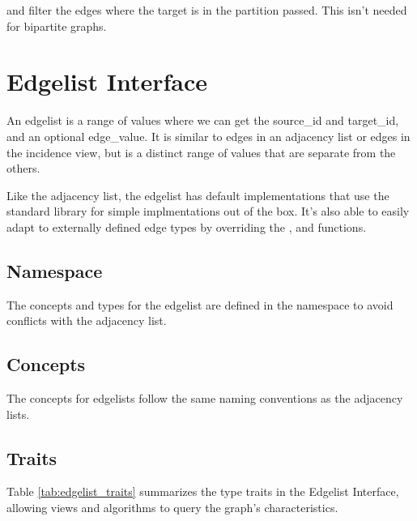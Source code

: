  and  filter the edges where the target is in the partition  passed.
This isn't needed for bipartite graphs.

\section{Edgelist Interface}
An edgelist is a range of values where we can get the source\_id and target\_id, and an optional edge\_value. It is similar to edges in an
adjacency list or edges in the incidence view, but is a distinct range of values that are separate from the others.

Like the adjacency list, the edgelist has default implementations that use the standard library for simple implmentations out of the box.
It's also able to easily adapt to externally defined edge types by overriding the ,  and 
 functions.

\subsection{Namespace}
The concepts and types for the edgelist are defined in the  namespace to avoid conflicts with the adjacency list.



\subsection{Concepts}
The concepts for edgelists follow the same naming conventions as the adjacency lists. 

{\small
     
}
\subsection{Traits}
Table \ref{tab:edgelist_traits} summarizes the type traits in the Edgelist Interface, allowing views and algorithms to query the graph's characteristics.


